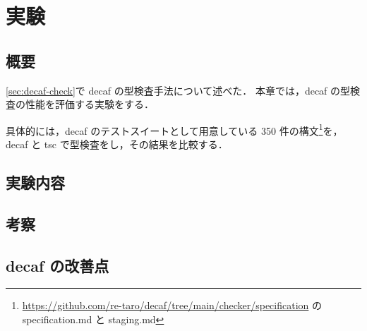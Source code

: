 \chapter{実験}

\section{概要}

\ref{sec:decaf-check}で decaf の型検査手法について述べた．
本章では，decaf の型検査の性能を評価する実験をする．

具体的には，decaf のテストスイートとして用意している 350 件の構文\footnote{\url{https://github.com/re-taro/decaf/tree/main/checker/specification} の specification.md と staging.md}を，
decaf と tsc で型検査をし，その結果を比較する．

\section{実験内容}

\section{考察}

\section{decaf の改善点}

